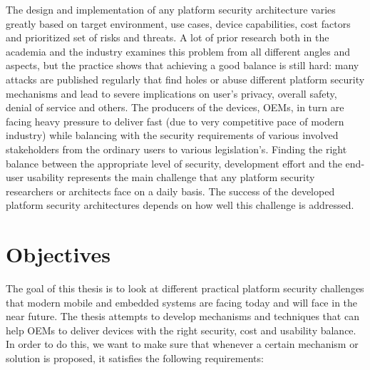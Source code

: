 The design and implementation of any platform security architecture varies greatly based on target environment, use cases, device capabilities, cost factors and prioritized set of risks and threats. A lot of prior research both in the academia and the industry examines this problem from all different angles and aspects, but the practice shows that achieving a good balance is still hard: many attacks are published regularly that find holes or abuse different platform security mechanisms and lead to severe implications on user's privacy, overall safety, denial of service and others. The producers of the devices, OEMs, in turn are facing heavy pressure to deliver fast (due to very competitive pace of modern industry) while balancing with the security requirements of various involved stakeholders from the ordinary users to various legislation’s. Finding the right balance between the appropriate level of security, development effort and the end-user usability represents the main challenge that any platform security researchers or architects face on a daily basis. The success of the developed platform security architectures depends on how well this challenge is addressed.   

\section{Objectives}
\label{sec:Objectives}

The goal of this thesis is to look at different practical platform security challenges that modern mobile and embedded systems are facing today and will face in the near future. The thesis attempts to develop mechanisms and techniques that can help OEMs to deliver devices with the right security, cost and usability balance. In order to do this, we want to make sure that whenever a certain mechanism or solution is proposed, it satisfies the following requirements:

